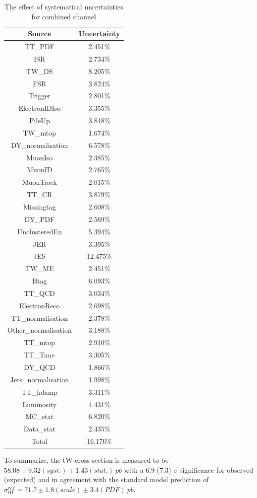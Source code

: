 \begin{table}[]
\centering
\caption{The effect of systematical uncertainties for combined channel}
\label{tab:uncert_effect}
\begin{tabular}{|c|c|}
\hline
Source & Uncertainty \\ \hline \hline

TT\_PDF & 2.451\% \\ \hline
ISR & 2.734\% \\ \hline
TW\_DS & 8.205\% \\ \hline
FSR & 3.824\% \\ \hline
Trigger & 2.801\% \\ \hline
ElectronIDIso & 3.355\% \\ \hline
PileUp & 3.848\% \\ \hline
TW\_mtop & 1.674\% \\ \hline
DY\_normalisation & 6.578\% \\ \hline
MuonIso & 2.385\% \\ \hline
MuonID & 2.765\% \\ \hline
MuonTrack & 2.015\% \\ \hline
TT\_CR & 3.879\% \\ \hline
Missingtag & 2.608\% \\ \hline
DY\_PDF & 2.569\% \\ \hline
UnclusteredEn & 5.394\% \\ \hline
JER & 3.395\% \\ \hline
JES & 12.475\% \\ \hline
TW\_ME & 2.451\% \\ \hline
Btag & 6.093\% \\ \hline
TT\_QCD & 3.034\% \\ \hline
ElectronReco & 2.698\% \\ \hline
TT\_normalisation & 2.378\% \\ \hline
Other\_normalisation & 3.188\% \\ \hline
TT\_mtop & 2.910\% \\ \hline
TT\_Tune & 3.305\% \\ \hline
DY\_QCD & 1.866\% \\ \hline
Jets\_normalisation & 1.998\% \\ \hline
TT\_hdamp & 3.311\% \\ \hline
Luminosity & 4.431\% \\ \hline
MC\_stat & 6.820\% \\ \hline
Data\_stat & 2.435\% \\ \hline
Total & 16.176\% \\ \hline

\end{tabular}
\end{table}

To summarize, the tW cross-section is measured to be $58.08\pm9.32(syst.)\pm1.43(stat.)~pb$ with a 6.9 (7.3) $\sigma$ significance for observed (expected) and in
agreement with the standard model prediction of $\sigma_{tW}^{ref} = 71.7 \pm 1.8 (scale) \pm 3.4 (PDF)~pb$.

